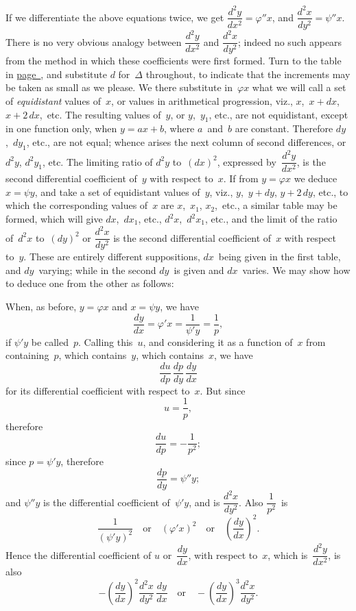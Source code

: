 \documentclass[12pt]{book}[2005/09/16]
\newcommand{\Pagelabel}[1]{\phantomsection\label{page:#1}}
\newcommand{\PageSep}[1]{\Pagelabel{#1}\ignorespaces}
\newcommand{\PageRef}[2][page]{\hyperref[page:#2]{#1~\pageref*{page:#2}}}
\renewcommand{\(}{{\upshape(}}
\renewcommand{\)}{{\upshape)}}
\renewcommand{\phi}{\varphi}
\begin{document}
If we differentiate the above equations twice, we get
\PageSep{104}
$\dfrac{d^{2} y}{dx^{2}} = \phi'' x$, and $\dfrac{d^{2} x}{dy^{2}} = \psi'' x$. There is no very obvious
analogy between $\dfrac{d^{2} y}{dx^{2}}$ and $\dfrac{d^{2} x}{dy^{2}}$; indeed no such appears
from the method in which these coefficients were first
formed. Turn to the table in \PageRef{90}, and substitute
$d$ for~$\Delta$ throughout, to indicate that the increments
may be taken as small as we please. We there substitute
in~$\phi x$ what we will call a set of \emph{equidistant} values
%
%
of~$x$, or values in arithmetical progression, viz.,
$x$,~$x + dx$, $x + 2\, dx$,~etc. The resulting values of~$y$,
or $y$,~$y_{1}$, etc., are not equidistant, except in one function
only, when $y = ax + b$, where $a$~and~$b$ are constant.
Therefore $dy$,~$dy_{1}$, etc., are not equal; whence
arises the next column of second differences, or $d^{2} y$,
$d^{2} y_{1}$, etc. The limiting ratio of $d^{2} y$ to~$(dx)^{2}$, expressed
by~$\dfrac{d^{2} y}{dx^{2}}$, is the second differential coefficient of~$y$ with
respect to~$x$. If from $y = \phi x$ we deduce $x = \psi y$, and
take a set of equidistant values of~$y$, viz., $y$,~$y + dy$,
$y + 2\, dy$, etc., to which the corresponding values of~$x$
are $x$,~$x_{1}$, $x_{2}$,~etc., a similar table may be formed,
which will give $dx$,~$dx_{1}$, etc., $d^{2} x$,~$d^{2} x_{1}$, etc., and the
limit of the ratio of~$d^{2} x$ to~$(dy)^{2}$ or $\dfrac{d^{2} x}{dy^{2}}$ is the second
differential coefficient of~$x$ with respect to~$y$. These
are entirely different suppositions, $dx$~being given in
the first table, and $dy$~varying; while in the second $dy$~is
given and $dx$~varies. We may show how to deduce
one from the other as follows:

When, as before, $y = \phi x$ and $x = \psi y$, we have
\[
\frac{dy}{dx} = \phi' x = \frac{1}{\psi' y} = \frac{1}{p},
\]
if $\psi' y$ be called~$p$. Calling this~$u$, and considering it
\PageSep{105}
as a function of~$x$ from containing~$p$, which contains~$y$,
which contains~$x$, we have
\[
\frac{du}{dp}\, \frac{dp}{dy}\, \frac{dy}{dx}
\]
for its differential coefficient with respect to~$x$. But
since
\[
u = \frac{1}{p},
\]
therefore
\[
\frac{du}{dp} = -\frac{1}{p^{2}};
\]
since $p = \psi' y$, therefore
\[
\frac{dp}{dy} = \psi'' y;
\]
and $\psi'' y$ is the differential coefficient of~$\psi' y$, and is
$\dfrac{d^{2} x}{dy^{2}}$. Also $\dfrac{1}{p^{2}}$~is
\[
\frac{1}{(\psi' y)^{2}} \quad\text{or}\quad
(\phi' x)^{2} \quad\text{or}\quad
\left(\frac{dy}{dx}\right)^{2}.
\]
Hence the differential coefficient of $u$ or~$\dfrac{dy}{dx}$, with respect
to~$x$, which is~$\dfrac{d^{2} y}{dx^{2}}$, is also
\[
-\left(\frac{dy}{dx}\right)^{2} \frac{d^{2} x}{dy^{2}}\, \frac{dy}{dx}
\quad\text{or}\quad
-\left(\frac{dy}{dx}\right)^{3} \frac{d^{2} x}{dy^{2}}.
\]
\end{document}
